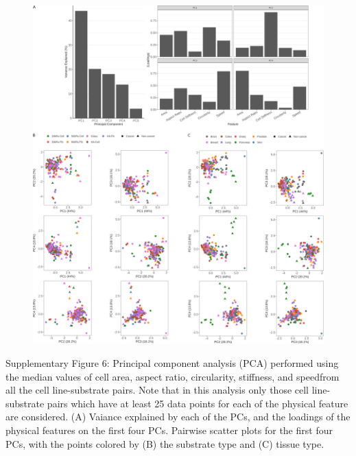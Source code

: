 \documentclass[11pt,letterpaper,english,oneside]{article} %
\begin{document}

\begin{figure}[H]
    \hspace*{-2cm}
    \vspace*{2cm}
    \centering
    \includegraphics[scale=0.7]{../Figures/Supplementary_Figure6/supplementary_figure6.png}
    \caption{}
    \label{fig:fig6}
\end{figure}
\begin{adjustwidth}{1cm}{1cm}
  Supplementary Figure 6: Principal component analysis (PCA) performed using the median values of cell area, aspect ratio, circularity, stiffness, and speedfrom all the cell line-substrate pairs.
  Note that in this analysis only those cell line-substrate pairs which have at least 25 data points for each of the physical feature are considered.
  (A) Vaiance explained by each of the PCs, and the loadings of the physical features on the first four PCs.
  Pairwise scatter plots for the first four PCs, with the points colored by (B) the substrate type and (C) tissue type. 
\end{adjustwidth}
\end{document}
